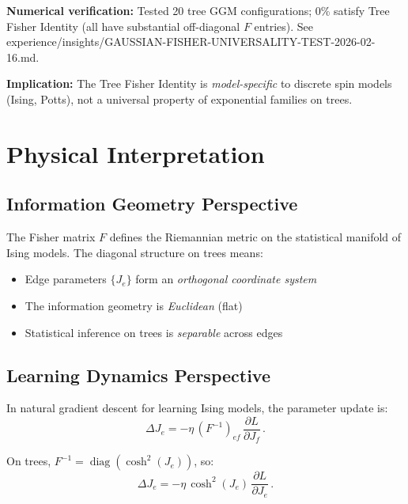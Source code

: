 \documentclass[11pt]{article}
\theoremstyle{definition}
\theoremstyle{remark}
\begin{document}
\textbf{Numerical verification:} Tested 20 tree GGM configurations;
0\% satisfy Tree Fisher Identity (all have substantial off-diagonal
$F$ entries). See experience/insights/GAUSSIAN-FISHER-UNIVERSALITY-TEST-2026-02-16.md.

\textbf{Implication:} The Tree Fisher Identity is \emph{model-specific} to
discrete spin models (Ising, Potts), not a universal property of exponential
families on trees.

\section{Physical Interpretation}

\subsection{Information Geometry Perspective}

The Fisher matrix $F$ defines the Riemannian metric on the statistical
manifold of Ising models. The diagonal structure on trees means:

\begin{itemize}
\item Edge parameters $\{J_e\}$ form an \emph{orthogonal coordinate system}

\item The information geometry is \emph{Euclidean} (flat)

\item Statistical inference on trees is \emph{separable} across edges
\end{itemize}

\subsection{Learning Dynamics Perspective}

In natural gradient descent for learning Ising models, the parameter update
is:
\begin{equation}
\Delta J_e = -\eta\, (F^{-1})_{ef}\, \frac{\partial L}{\partial J_f}\,.
\end{equation}

On trees, $F^{-1} = \operatorname{diag}(\cosh^2(J_e))$, so:
\begin{equation}
\Delta J_e = -\eta\, \cosh^2(J_e)\, \frac{\partial L}{\partial J_e}\,.
\end{equation}
\end{document}
